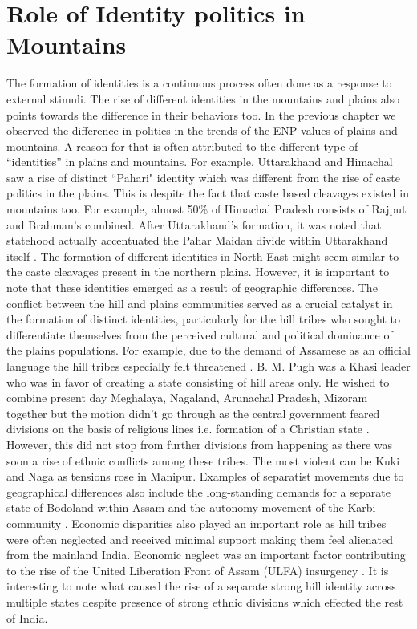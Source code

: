 \section{Role of Identity politics in Mountains}
\begin{sloppypar}
The formation of identities is a continuous process often done as a response to external stimuli. The rise of different identities in the mountains and plains also points towards the difference in their behaviors too. In the previous chapter we observed the difference in politics in the trends of the ENP values of plains and mountains. A reason for that is often attributed to the different type of ``identities'' in plains and mountains. For example, Uttarakhand and Himachal saw a rise of distinct ``Pahari" identity \citep{mishra2000politics} which was different from the rise of caste politics in the plains. This is despite the fact that caste based cleavages existed in mountains too. For example, almost 50\% of Himachal Pradesh consists of Rajput and Brahman's combined. After Uttarakhand's formation, it was noted that statehood actually accentuated the Pahar Maidan divide within Uttarakhand itself \citep{mathur2015remote}. The formation of different identities in North East might seem similar to the caste cleavages present in the northern plains. However, it is important to note that these identities emerged as a result of geographic differences. The conflict between the hill and plains communities served as a crucial catalyst in the formation of distinct identities, particularly for the hill tribes who sought to differentiate themselves from the perceived cultural and political dominance of the plains populations. For example, due to the demand of Assamese as an official language the hill tribes especially felt threatened \citep{inoue2005integration}.  B. M. Pugh was a Khasi leader who was in favor of creating a state consisting of hill areas only. He wished to combine present day Meghalaya, Nagaland, Arunachal Pradesh, Mizoram together but the motion didn't go through as the central government feared divisions on the basis of religious lines i.e. formation of a Christian state \citep{karlsson2013evading}. However, this did not stop from further divisions from happening as there was soon a rise of ethnic conflicts among these tribes. The most violent can be Kuki and Naga as tensions rose in Manipur. Examples of separatist movements due to geographical differences also include the long\hyp{}standing demands for a separate state of Bodoland within Assam  and the autonomy movement of the Karbi community \citep{sarma2017bodoland}. Economic disparities also played an important role as hill tribes were often neglected and received minimal support making them feel alienated from the mainland India. Economic neglect was an important factor contributing to the rise of the United Liberation Front of Assam (ULFA) insurgency \citep{chima2023insurgency}. It is interesting to note what caused the rise of a separate strong hill identity across multiple states despite presence of strong ethnic divisions which effected the rest of India. 
    
\end{sloppypar}

